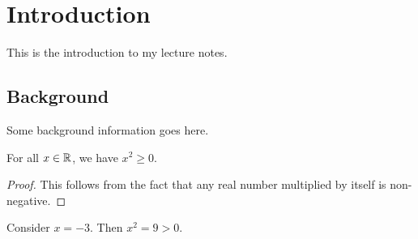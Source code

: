 \section{Introduction}

This is the introduction to my lecture notes.

\subsection{Background}

Some background information goes here.

\begin{theorem}
    For all $x \in \mathbb{R}$, we have $x^2 \geq 0$.
\end{theorem}

\begin{proof}
    This follows from the fact that any real number multiplied by itself is non-negative.
\end{proof}

\begin{example}
    Consider $x = -3$. Then $x^2 = 9 > 0$.
\end{example}
